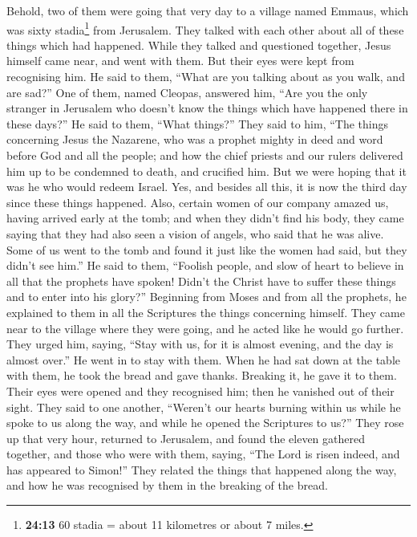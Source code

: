  Behold, two of them were going that very day to a
village named Emmaus, which was sixty stadia\footnote{\textbf{24:13} 60
  stadia = about 11 kilometres or about 7 miles.} from Jerusalem.
 They talked with each other about all of these things
which had happened.  While they talked and questioned
together, Jesus himself came near, and went with them. 
But their eyes were kept from recognising him.  He said
to them, ``What are you talking about as you walk, and are sad?''
 One of them, named Cleopas, answered him, ``Are you the
only stranger in Jerusalem who doesn't know the things which have
happened there in these days?''  He said to them, ``What
things?'' They said to him, ``The things concerning Jesus the Nazarene,
who was a prophet mighty in deed and word before God and all the people;
 and how the chief priests and our rulers delivered him
up to be condemned to death, and crucified him.  But we
were hoping that it was he who would redeem Israel. Yes, and besides all
this, it is now the third day since these things happened.
 Also, certain women of our company amazed us, having
arrived early at the tomb;  and when they didn't find his
body, they came saying that they had also seen a vision of angels, who
said that he was alive.  Some of us went to the tomb and
found it just like the women had said, but they didn't see him.''
 He said to them, ``Foolish people, and slow of heart to
believe in all that the prophets have spoken!  Didn't the
Christ have to suffer these things and to enter into his glory?''
 Beginning from Moses and from all the prophets, he
explained to them in all the Scriptures the things concerning himself.
 They came near to the village where they were going, and
he acted like he would go further.  They urged him,
saying, ``Stay with us, for it is almost evening, and the day is almost
over.'' He went in to stay with them.  When he had sat
down at the table with them, he took the bread and gave thanks. Breaking
it, he gave it to them.  Their eyes were opened and they
recognised him; then he vanished out of their sight. 
They said to one another, ``Weren't our hearts burning within us while
he spoke to us along the way, and while he opened the Scriptures to
us?''  They rose up that very hour, returned to
Jerusalem, and found the eleven gathered together, and those who were
with them,  saying, ``The Lord is risen indeed, and has
appeared to Simon!''  They related the things that
happened along the way, and how he was recognised by them in the
breaking of the bread.


